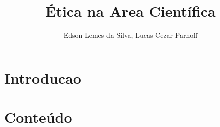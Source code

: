 \documentclass[12pt]{article}
\title{Ética na Area Científica}
\author{Edson Lemes da Silva, Lucas Cezar Parnoff}
\begin{document}
 

\maketitle

\begin{abstract}
  
\end{abstract}
     
\begin{resumo} 
  
\end{resumo}


\section{Introducao}

\section{Conteúdo} \label{sec:conteudo}




\end{document}
